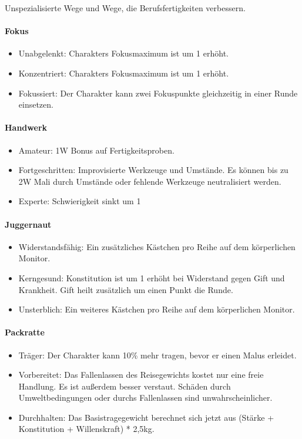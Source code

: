 \documentclass{article}
\begin{document}
Unspezialisierte Wege und Wege, die Berufsfertigkeiten verbessern.

\paragraph{Fokus}

\begin{itemize}
\item Unabgelenkt: Charakters Fokusmaximum ist um 1 erhöht.
\item Konzentriert: Charakters Fokusmaximum ist um 1 erhöht.
\item Fokussiert: Der Charakter kann zwei Fokuspunkte gleichzeitig in einer Runde einsetzen.
\end{itemize}

\paragraph{Handwerk}

\begin{itemize}
\item Amateur: 1W Bonus auf Fertigkeitsproben.
\item Fortgeschritten: Improvisierte Werkzeuge und Umstände. Es können bis zu 2W Mali durch Umstände oder fehlende Werkzeuge neutralisiert werden.
\item Experte: Schwierigkeit sinkt um 1
\end{itemize}

\paragraph{Juggernaut}

\begin{itemize}
\item Widerstandsfähig: Ein zusätzliches Kästchen pro Reihe auf dem körperlichen Monitor.
\item Kerngesund: Konstitution ist um 1 erhöht bei Widerstand gegen Gift und Krankheit. Gift heilt zusätzlich um einen Punkt die Runde.
\item Unsterblich: Ein weiteres Kästchen pro Reihe auf dem körperlichen Monitor.
\end{itemize}

\paragraph{Packratte}

\begin{itemize}
\item Träger: Der Charakter kann 10\% mehr tragen, bevor er einen Malus erleidet.
\item Vorbereitet: Das Fallenlassen des Reisegewichts kostet nur eine freie Handlung. Es ist außerdem besser verstaut. Schäden durch Umweltbedingungen oder durchs Fallenlassen sind unwahrscheinlicher.
\item Durchhalten: Das Basistragegewicht berechnet sich jetzt aus (Stärke + Konstitution +  Willenskraft) * 2,5kg.
\end{itemize}
\end{document}
